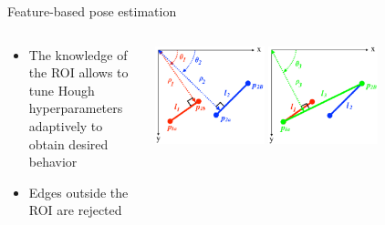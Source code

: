 \documentclass[10pt]{beamer}
\begin{document}
\begin{frame}{Feature-based pose estimation}
  \begin{columns}[T,onlytextwidth]
    \begin{column}{0.6\textwidth}
      \begin{itemize}[leftmargin=0.45cm,label=$\bullet$]
        \item The knowledge of the ROI allows to tune Hough hyperparameters adaptively to obtain desired behavior
              \smallskip
        \item Edges outside the ROI are rejected
      \end{itemize}
    \end{column}
    \begin{column}{0.5\textwidth}
      \vspace{0.28cm}
      \centering
      \hspace{-0.95cm}
      \includegraphics[width=0.35\textwidth]{gfx/segmentsPreMerge.eps}
      \hspace{0.1cm}
      \includegraphics[width=0.35\textwidth]{gfx/segmentsAfterMerge.eps}
    \end{column}
  \end{columns}

\end{frame}
\end{document}
